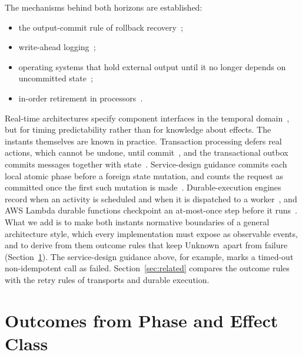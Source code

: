 \documentclass[11pt]{article}
\theoremstyle{definition}
\theoremstyle{plain}
\newcommand{\Unknown}{\textsf{Unknown}}
\begin{document}
The mechanisms behind both horizons are established:
\begin{itemize}[nosep]
  \item the output-commit rule of rollback recovery~\citep{StromYemini1985,Elnozahy2002};
  \item write-ahead logging~\citep{Mohan1992ARIES};
  \item operating systems that hold external output until it no longer depends on uncommitted state~\citep{Nightingale2005Speculator,Nightingale2006Rethink};
  \item in-order retirement in processors~\citep{SmithPleszkun1985}.
\end{itemize}
Real-time architectures specify component interfaces in the temporal domain~\citep{KopetzBauer2003}, but for timing predictability rather than for knowledge about effects. The instants themselves are known in practice. Transaction processing defers real actions, which cannot be undone, until commit~\citep{Gray1981}, and the transactional outbox commits messages together with state~\citep{Richardson2018}. Service-design guidance commits each local atomic phase before a foreign state mutation, and counts the request as committed once the first such mutation is made~\citep{Leach2017Idempotency}. Durable-execution engines record when an activity is scheduled and when it is dispatched to a worker~\citep{TemporalEvents}, and AWS Lambda durable functions checkpoint an at-most-once step before it runs~\citep{AWSDurableSteps}. What we add is to make both instants normative boundaries of a general architecture style, which every implementation must expose as observable events, and to derive from them outcome rules that keep \Unknown\ apart from failure (Section~\ref{sec:outcomes}). The service-design guidance above, for example, marks a timed-out non-idempotent call as failed. Section~\ref{sec:related} compares the outcome rules with the retry rules of transports and durable execution.

\section{Outcomes from Phase and Effect Class}
\label{sec:outcomes}
\end{document}
